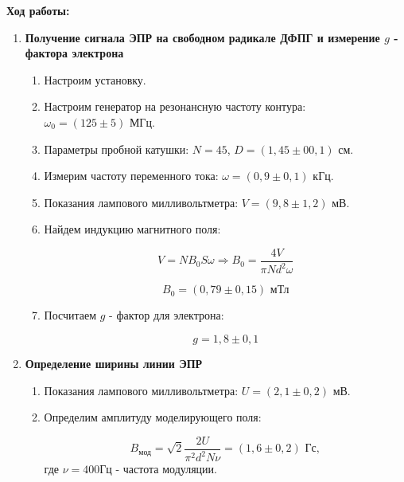 \documentclass[a4paper, 12pt]{article}%
\begin{document}
\textbf{Ход работы:}\\\par

\begin{enumerate}

	\item \textbf{Получение сигнала ЭПР на свободном радикале ДФПГ и измерение $g$ - фактора электрона}
	
		\begin{enumerate}
	
		\item Настроим установку.
	
		\item Настроим генератор на резонансную частоту контура: $\omega_0 = (125 \pm 5) \text{ МГц}$.
	
		\item Параметры пробной катушки: $N = 45$,  $D = (1,45 \pm 00,1) \text{ см}$.
		
		\item Измерим частоту переменного тока: $\omega = (0,9 \pm 0,1) \text{ кГц}$.
	
		\item Показания лампового милливольтметра: $V = (9,8 \pm 1,2) \text{ мВ}$.	
		
		\item Найдем индукцию магнитного поля:
	
		\[ V = NB_0S\omega \Rightarrow B_0 = \frac{4V}{\pi N d^2 \omega}\]
	
		\[B_0 = (0,79 \pm 0,15) \text{ мТл}\]
	
		\item Посчитаем $g$ - фактор для электрона:
		
		\[ g = 1, 8 \pm 0,1\]
	
		\end{enumerate}	 
		            	    	
	\item \textbf{Определение ширины линии ЭПР}
	
		\begin{enumerate}
		
		\item Показания лампового милливольтметра: $U = (2,1 \pm 0,2) \text{ мВ}$.	
					
		\item Определим амплитуду моделирующего поля:
		
		\[B_\text{мод} = \sqrt{2} \frac{2U}{\pi^2d^2N\nu} = (1,6 \pm 0,2) \text{ Гс},\]
		где $\nu = 400 \text{Гц}$ - частота модуляции.
		

\end{enumerate}
\end{enumerate}
\end{document}
